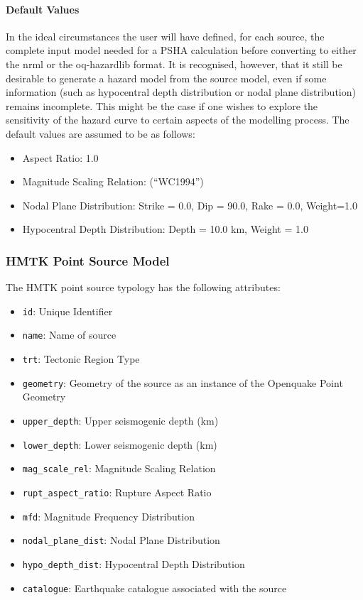 \paragraph{Default Values}

In the ideal circumstances the user will have defined, for each source, the complete input model needed for a PSHA calculation before converting to either the nrml or the oq-hazardlib format. It is recognised, however, that it still be desirable to generate a hazard model from the source model, even if some information (such as hypocentral depth distribution or nodal plane distribution) remains incomplete. This might be the case if one wishes to explore the sensitivity of the hazard curve to certain aspects of the modelling process. The default values are assumed to be as follows:

\begin{itemize}
\item Aspect Ratio: 1.0
\item Magnitude Scaling Relation: \cite{wells1994} (``WC1994'')
\item Nodal Plane Distribution: Strike = 0.0, Dip = 90.0, Rake = 0.0, Weight=1.0
\item Hypocentral Depth Distribution: Depth = 10.0 km, Weight = 1.0
\end{itemize}

\subsubsection{HMTK Point Source Model}

The HMTK point source typology has the following attributes:

\begin{itemize}

\item \verb=id=: Unique Identifier
\item \verb=name=: Name of source
\item \verb=trt=: Tectonic Region Type
\item \verb=geometry=: Geometry of the source as an instance of the Openquake Point Geometry 
\item \verb=upper_depth=: Upper seismogenic depth (km)
\item \verb=lower_depth=: Lower seismogenic depth (km)
\item \verb=mag_scale_rel=: Magnitude Scaling Relation
\item \verb=rupt_aspect_ratio=: Rupture Aspect Ratio
\item \verb=mfd=: Magnitude Frequency Distribution
\item \verb=nodal_plane_dist=: Nodal Plane Distribution
\item \verb=hypo_depth_dist=: Hypocentral Depth Distribution
\item \verb=catalogue=: Earthquake catalogue associated with the source
\end{itemize}

